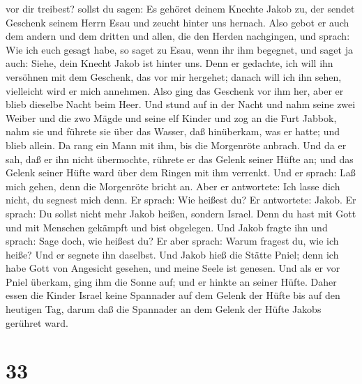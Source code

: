 vor dir treibest?  sollst du sagen: Es gehöret deinem
Knechte Jakob zu, der sendet Geschenk seinem Herrn Esau und zeucht
hinter uns hernach.  Also gebot er auch dem andern und dem
dritten und allen, die den Herden nachgingen, und sprach: Wie ich euch
gesagt habe, so saget zu Esau, wenn ihr ihm begegnet,  und
saget ja auch: Siehe, dein Knecht Jakob ist hinter uns. Denn er
gedachte, ich will ihn versöhnen mit dem Geschenk, das vor mir hergehet;
danach will ich ihn sehen, vielleicht wird er mich annehmen.
 Also ging das Geschenk vor ihm her, aber er blieb dieselbe
Nacht beim Heer.  Und stund auf in der Nacht und nahm seine
zwei Weiber und die zwo Mägde und seine elf Kinder und zog an die Furt
Jabbok,  nahm sie und führete sie über das Wasser, daß
hinüberkam, was er hatte;  und blieb allein. Da rang ein
Mann mit ihm, bis die Morgenröte anbrach.  Und da er sah,
daß er ihn nicht übermochte, rührete er das Gelenk seiner Hüfte an; und
das Gelenk seiner Hüfte ward über dem Ringen mit ihm verrenkt.
 Und er sprach: Laß mich gehen, denn die Morgenröte bricht
an. Aber er antwortete: Ich lasse dich nicht, du segnest mich denn.
 Er sprach: Wie heißest du? Er antwortete: Jakob.
 Er sprach: Du sollst nicht mehr Jakob heißen, sondern
Israel. Denn du hast mit Gott und mit Menschen gekämpft und bist
obgelegen.  Und Jakob fragte ihn und sprach: Sage doch, wie
heißest du? Er aber sprach: Warum fragest du, wie ich heiße? Und er
segnete ihn daselbst.  Und Jakob hieß die Stätte Pniel;
denn ich habe Gott von Angesicht gesehen, und meine Seele ist genesen.
 Und als er vor Pniel überkam, ging ihm die Sonne auf; und
er hinkte an seiner Hüfte.  Daher essen die Kinder Israel
keine Spannader auf dem Gelenk der Hüfte bis auf den heutigen Tag, darum
daß die Spannader an dem Gelenk der Hüfte Jakobs gerühret ward.

\hypertarget{section-32}{%
\section{33}\label{section-32}}

